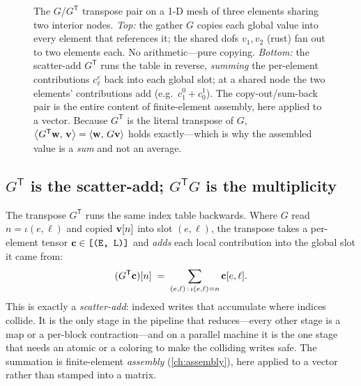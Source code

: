 \begin{figure}[t]
\caption[Gather copies out; scatter sums back]{The $G$/$G^{\mathsf T}$ transpose
pair on a 1-D mesh of three elements sharing two interior nodes. \emph{Top:} the
gather $G$ copies each global value into every element that references it; the
shared dofs $v_1,v_2$ (rust) fan out to two elements each. No arithmetic---pure
copying. \emph{Bottom:} the scatter-add $G^{\mathsf T}$ runs the table in reverse,
\emph{summing} the per-element contributions $c^e_\ell$ back into each global slot;
at a shared node the two elements' contributions add (e.g.\ $c^0_1+c^1_0$). The
copy-out/sum-back pair is the entire content of finite-element assembly, here
applied to a vector. Because $G^{\mathsf T}$ is the literal transpose of $G$,
$\left\langle G^{\mathsf T}\mathbf{w},\, \mathbf{v}\right\rangle=\left\langle \mathbf{w},\, G\mathbf{v}\right\rangle$ holds exactly---which is why the
assembled value is a \emph{sum} and not an average.}
\label{fig:appk-gatherscatter}
\end{figure}

\subsection{$G^{\mathsf T}$ is the scatter-add; $G^{\mathsf T}G$ is the multiplicity}

The transpose $G^{\mathsf T}$ runs the same index table backwards. Where $G$ read
$n=\iota(e,\ell)$ and copied $\mathbf{v}[n]$ into slot $(e,\ell)$, the transpose takes a
per-element tensor $\mathbf{c}\in\texttt{[(E, L)]}$ and \emph{adds} each local contribution
into the global slot it came from:
\begin{equation}
  (G^{\mathsf T}\mathbf{c})[n] \;=\; \sum_{(e,\ell)\,:\,\iota(e,\ell)=n} \mathbf{c}[e,\ell].
  \label{eq:appk-scatter}
\end{equation}
This is exactly a \emph{scatter-add}: indexed writes that accumulate where indices
collide. It is the only stage in the pipeline that reduces---every other stage is a
map or a per-block contraction---and on a parallel machine it is the one stage that
needs an atomic or a coloring to make the colliding writes safe. The summation is
finite-element \emph{assembly} (\cref{ch:assembly}), here applied to a vector
rather than stamped into a matrix.

